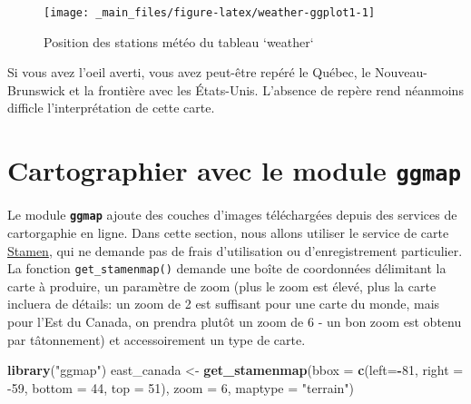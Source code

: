 \documentclass[]{book}
\newenvironment{Shaded}{\begin{snugshade}}{\end{snugshade}}
\newcommand{\DataTypeTok}[1]{\textcolor[rgb]{0.13,0.29,0.53}{#1}}
\newcommand{\DecValTok}[1]{\textcolor[rgb]{0.00,0.00,0.81}{#1}}
\newcommand{\KeywordTok}[1]{\textcolor[rgb]{0.13,0.29,0.53}{\textbf{#1}}}
\newcommand{\NormalTok}[1]{#1}
\newcommand{\OperatorTok}[1]{\textcolor[rgb]{0.81,0.36,0.00}{\textbf{#1}}}
\newcommand{\StringTok}[1]{\textcolor[rgb]{0.31,0.60,0.02}{#1}}
\begin{document}
\begin{Shaded}
\end{Shaded}

\begin{figure}

{\centering \texttt{[image: \_main\_files/figure-latex/weather-ggplot1-1]} 

}

\caption{Position des stations météo du tableau `weather`}\label{fig:weather-ggplot1}
\end{figure}

Si vous avez l'oeil averti, vous avez peut-être repéré le Québec, le
Nouveau-Brunswick et la frontière avec les États-Unis. L'absence de
repère rend néanmoins difficle l'interprétation de cette carte.

\hypertarget{cartographier-avec-le-module-ggmap}{%
\section{\texorpdfstring{Cartographier avec le module
\textbf{\texttt{ggmap}}}{Cartographier avec le module ggmap}}\label{cartographier-avec-le-module-ggmap}}

Le module \textbf{\texttt{ggmap}} ajoute des couches d'images
téléchargées depuis des services de cartorgaphie en ligne. Dans cette
section, nous allons utiliser le service de carte
\href{http://maps.stamen.com}{Stamen}, qui ne demande pas de frais
d'utilisation ou d'enregistrement particulier. La fonction
\texttt{get\_stamenmap()} demande une boîte de coordonnées délimitant la
carte à produire, un paramètre de zoom (plus le zoom est élevé, plus la
carte incluera de détails: un zoom de 2 est suffisant pour une carte du
monde, mais pour l'Est du Canada, on prendra plutôt un zoom de 6 - un
bon zoom est obtenu par tâtonnement) et accessoirement un type de carte.

\begin{Shaded}
\begin{Highlighting}[]
\KeywordTok{library}\NormalTok{(}\StringTok{"ggmap"}\NormalTok{)}
\NormalTok{east_canada <-}\StringTok{ }\KeywordTok{get_stamenmap}\NormalTok{(}\DataTypeTok{bbox =} \KeywordTok{c}\NormalTok{(}\DataTypeTok{left=}\OperatorTok{-}\DecValTok{81}\NormalTok{, }\DataTypeTok{right =} \DecValTok{-59}\NormalTok{, }\DataTypeTok{bottom =} \DecValTok{44}\NormalTok{, }\DataTypeTok{top =} \DecValTok{51}\NormalTok{),}
                             \DataTypeTok{zoom =} \DecValTok{6}\NormalTok{,}
                             \DataTypeTok{maptype =} \StringTok{"terrain"}\NormalTok{)}
\end{Highlighting}
\end{Shaded}
\end{document}
